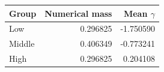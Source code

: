 \begin{tabular}{lrr}\toprule Group & Numerical mass & Mean $\gamma$\\\midrule
Low & 0.296825 & -1.750590 \\
Middle & 0.406349 & -0.773241 \\
High & 0.296825 & 0.204108 \\
\bottomrule\end{tabular}
